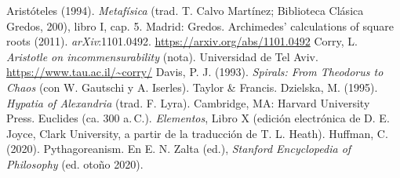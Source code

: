 \documentclass[11pt]{article}
\begin{document}
\begin{referencias}
 Aristóteles (1994). \emph{Metafísica} (trad. T. Calvo
  Martínez; Biblioteca Clásica Gredos, 200), libro I, cap. 5. Madrid: Gredos.
 Archimedes' calculations of square roots (2011).
  \emph{arXiv}:1101.0492. \url{https://arxiv.org/abs/1101.0492}
 Corry, L. \emph{Aristotle on incommensurability} (nota).
  Universidad de Tel Aviv. \url{https://www.tau.ac.il/~corry/}
 Davis, P. J. (1993). \emph{Spirals: From Theodorus to Chaos}
  (con W. Gautschi y A. Iserles). Taylor \& Francis.
 Dzielska, M. (1995). \emph{Hypatia of Alexandria} (trad.
  F. Lyra). Cambridge, MA: Harvard University Press.
 Euclides (ca. 300 a.\,C.). \emph{Elementos}, Libro X
  (edición electrónica de D. E. Joyce, Clark University, a partir de la
  traducción de T. L. Heath).
 Huffman, C. (2020). Pythagoreanism. En E. N. Zalta (ed.),
  \emph{Stanford Encyclopedia of Philosophy} (ed. otoño 2020).

\end{referencias}
\end{document}
